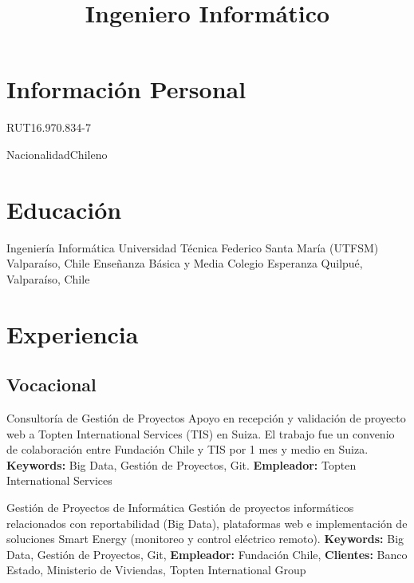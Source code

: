 \documentclass[11pt,a4paper]{moderncv}
\title{Ingeniero Informático}
\begin{document}
\maketitle

\section{Información Personal}

	   {RUT}{16.970.834-7}

	   {Nacionalidad}{Chileno}

\section{Educación}

        {Ingeniería Informática}
        {Universidad Técnica Federico Santa María (UTFSM)}
        {Valparaíso, Chile}
        {}
        {}
        {Enseñanza Básica y Media}
        {Colegio Esperanza}
        {Quilpué, Valparaíso, Chile}
        {}{}

\section{Experiencia}
\subsection{Vocacional}

        {Consultoría de Gestión de Proyectos}
        {Apoyo en recepción y validación de proyecto web a Topten International Services (TIS) en Suiza. El trabajo fue un convenio de colaboración entre Fundación Chile y TIS por 1 mes y medio en Suiza.}
        {\textbf{Keywords:} Big Data, Gestión de Proyectos, Git.}
        {\textbf{Empleador:} Topten International Services}
        {}

        {Gestión de Proyectos de Informática}
        {Gestión de proyectos informáticos relacionados con reportabilidad (Big Data), plataformas web e implementación de soluciones Smart Energy (monitoreo y control eléctrico remoto).}
        {\textbf{Keywords:} Big Data, Gestión de Proyectos, Git, }
        {\textbf{Empleador:} Fundación Chile, \textbf{Clientes:} Banco Estado, Ministerio de Viviendas, Topten International Group}
        {}
\end{document}
